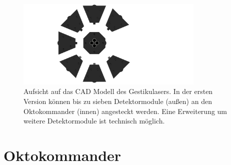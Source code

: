 \begin{figure}[h]
	\centering
	\includegraphics[width=9cm]{../CAD_Bilder/Gestikulaser_raytraced_2.png}
	\caption{Aufsicht auf das CAD Modell des Gestikulasers. In der ersten Version können bis zu sieben Detektormodule (außen) an den Oktokommander (innen) angesteckt werden. Eine Erweiterung um weitere Detektormodule ist technisch möglich.}
	\label{fig:Gestikulaser}
\end{figure}


\section{Oktokommander}
\label{sec:Oktokommander}

